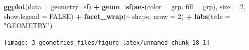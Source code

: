 \documentclass[
]{report}
\newenvironment{Shaded}{\begin{snugshade}}{\end{snugshade}}
\newcommand{\DataTypeTok}[1]{\textcolor[rgb]{0.13,0.29,0.53}{#1}}
\newcommand{\DecValTok}[1]{\textcolor[rgb]{0.00,0.00,0.81}{#1}}
\newcommand{\KeywordTok}[1]{\textcolor[rgb]{0.13,0.29,0.53}{\textbf{#1}}}
\newcommand{\NormalTok}[1]{#1}
\newcommand{\OperatorTok}[1]{\textcolor[rgb]{0.81,0.36,0.00}{\textbf{#1}}}
\newcommand{\OtherTok}[1]{\textcolor[rgb]{0.56,0.35,0.01}{#1}}
\newcommand{\StringTok}[1]{\textcolor[rgb]{0.31,0.60,0.02}{#1}}
\begin{document}
\begin{Shaded}
\begin{Highlighting}[]
\KeywordTok{ggplot}\NormalTok{(}\DataTypeTok{data =}\NormalTok{ geometry\_sf) }\OperatorTok{+}
\StringTok{  }\KeywordTok{geom\_sf}\NormalTok{(}\KeywordTok{aes}\NormalTok{(}\DataTypeTok{color =}\NormalTok{ grp, }\DataTypeTok{fill =}\NormalTok{ grp), }\DataTypeTok{size =} \DecValTok{2}\NormalTok{, }\DataTypeTok{show.legend =} \OtherTok{FALSE}\NormalTok{) }\OperatorTok{+}
\StringTok{  }\KeywordTok{facet\_wrap}\NormalTok{(}\OperatorTok{\textasciitilde{}}\StringTok{ }\NormalTok{shape, }\DataTypeTok{nrow =} \DecValTok{2}\NormalTok{) }\OperatorTok{+}
\StringTok{  }\KeywordTok{labs}\NormalTok{(}\DataTypeTok{title =} \StringTok{"GEOMETRY"}\NormalTok{)}
\end{Highlighting}
\end{Shaded}

\begin{center}\texttt{[image: 3-geometries\_files/figure-latex/unnamed-chunk-18-1]} \end{center}

  
\end{document}
